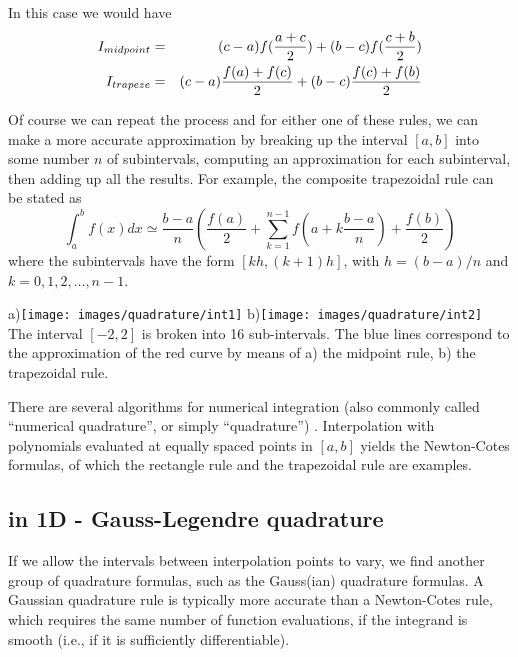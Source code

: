 

In this case we would have 
\begin{eqnarray}
I_{midpoint} &=& (c-a)f(\frac{a+c}{2}) + (b-c)f(\frac{c+b}{2})  \nonumber\\
I_{trapeze}  &=& (c-a)\frac{f(a)+f(c)}{2} + (b-c) \frac{f(c)+f(b)}{2} \nonumber
\end{eqnarray}

Of course we can repeat the process and for either one of these rules, 
we can make a more accurate approximation by 
breaking up the interval $[a,b]$ into some number $n$ of subintervals, computing 
an approximation for each subinterval, then adding up all the results. 
For example, 
the composite trapezoidal rule can be stated as
\begin{equation}
\int_a^b f(x)dx \simeq \frac{b-a}{n} \left( \frac{f(a)}{2}  
+\sum_{k=1}^{n-1} f\left(a+k\frac{b-a}{n}\right)
   +\frac{f(b)}{2} \right)
\end{equation}
where the subintervals have the form $[kh,(k+1)h]$, with $h=(b-a)/n$ and $k=0,1,2,\dots,n-1$.


\begin{center}
a)\texttt{[image: images/quadrature/int1]}
b)\texttt{[image: images/quadrature/int2]}\\
The interval $[-2,2]$ is broken into 16 sub-intervals. The blue lines correspond to the 
approximation of the red curve by means of a) the midpoint rule,  b) the trapezoidal rule.
\end{center}

There are several algorithms for numerical integration (also commonly called ``{\color{olive}numerical quadrature}'', or
simply ``{\color{olive}quadrature}'') .
Interpolation with polynomials evaluated at equally spaced points in $[a,b]$
yields the Newton-Cotes formulas, of which the rectangle rule and the trapezoidal rule are examples. 

\subsection{in 1D - Gauss-Legendre quadrature  \label{sec:quad1Dglq}}

If we allow the intervals between interpolation points to vary, we find another group of quadrature formulas, such as 
the Gauss(ian) quadrature formulas. 
A Gaussian quadrature rule is typically more accurate than a Newton-Cotes rule, 
which requires the same number of function evaluations, if the integrand is smooth 
(i.e., if it is sufficiently differentiable).


